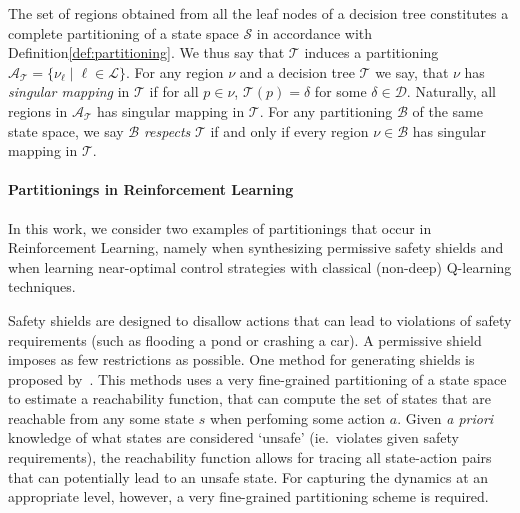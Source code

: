 


The set of regions obtained from all the leaf nodes of a decision tree
constitutes a complete partitioning of a state space $\mathcal{S}$ in accordance
with Definition\ref{def:partitioning}. We thus say that $\mathcal{T}$ induces a
partitioning $\mathcal{A}_{\mathcal{T}} = \{ \nu_{\ell} \mid \ell \in
\mathcal{L} \}$. For any region $\nu$ and a decision tree $\mathcal{T}$ we say,
that $\nu$ has \textit{singular mapping} in $\mathcal{T}$ if for all $p \in
\nu$, $\mathcal{T}(p) = \delta$ for some $\delta \in \mathcal{D}$. Naturally,
all regions in $\mathcal{A}_{\mathcal{T}}$ has singular mapping in
$\mathcal{T}$.  For any partitioning $\mathcal{B}$ of the same state space, we
say $\mathcal{B}$ \textit{respects} $\mathcal{T}$ if and only if every region
$\nu \in \mathcal{B}$ has singular mapping in $\mathcal{T}$.

\paragraph{Partitionings in Reinforcement Learning} In this work, we consider
two examples of partitionings that occur in Reinforcement Learning, namely when
synthesizing permissive safety shields and when learning near-optimal control
strategies with classical (non-deep) Q-learning techniques.

Safety shields are designed to disallow actions that can lead to violations of
safety requirements (such as flooding a pond or crashing a car). A permissive
shield imposes as few restrictions as possible. One method for generating
shields is proposed by~\cite{brorholtShieldedReinforcementLearning2023}. This
methods uses a very fine-grained partitioning of a state space to estimate a
reachability function, that can compute the set of states that are reachable
from any some state $s$ when perfoming some action $a$. Given \textit{a priori}
knowledge of what states are considered `unsafe' (ie.\ violates given safety
requirements), the reachability function allows for tracing all state-action
pairs that can potentially lead to an unsafe state. For capturing the dynamics
at an appropriate level, however, a very fine-grained partitioning scheme is
required.

